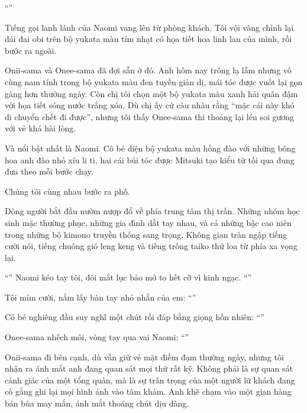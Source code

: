 \documentclass[../main.tex]{subfiles}
\begin{document}
``''

Tiếng gọi lanh lảnh của Naomi vang lên từ phòng khách. Tôi vội vàng chỉnh lại dải đai obi trên bộ yukata màu tím nhạt có họa tiết hoa linh lan của mình, rồi bước ra ngoài.

Onii-sama và Onee-sama đã đợi sẵn ở đó. Anh hôm nay trông lạ lẫm nhưng vô cùng nam tính trong bộ yukata màu đen tuyền giản dị, mái tóc được vuốt lại gọn gàng hơn thường ngày. Còn chị tôi chọn một bộ yukata màu xanh hải quân đậm với họa tiết sóng nước trắng xóa. Dù chị ấy cứ càu nhàu rằng ``mặc cái này khó di chuyển chết đi được'', nhưng tôi thấy Onee-sama thi thoảng lại lén soi gương với vẻ khá hài lòng.

Và nổi bật nhất là Naomi. Cô bé diện bộ yukata màu hồng đào với những bông hoa anh đào nhỏ xíu li ti, hai cái búi tóc được Mitsuki tạo kiểu từ tối qua đung đưa theo mỗi bước chạy.

Chúng tôi cùng nhau bước ra phố.

Dòng người bắt đầu nườm nượp đổ về phía trung tâm thị trấn. Những nhóm học sinh mặc thường phục, những gia đình dắt tay nhau, và cả những bậc cao niên trong những bộ kimono truyền thống sang trọng. Không gian tràn ngập tiếng cười nói, tiếng chuông gió leng keng và tiếng trống taiko thử loa từ phía xa vọng lại.

``'' Naomi kéo tay tôi, đôi mắt lục bảo mở to hết cỡ vì kinh ngạc. ``''

Tôi mỉm cười, nắm lấy bàn tay nhỏ nhắn của em: ``''

Cô bé nghiêng đầu suy nghĩ một chút rồi đáp bằng giọng hồn nhiên: ``''

Onee-sama nhếch môi, vòng tay qua vai Naomi: ``''

Onii-sama đi bên cạnh, dù vẫn giữ vẻ mặt điềm đạm thường ngày, nhưng tôi nhận ra ánh mắt anh đang quan sát mọi thứ rất kỹ. Không phải là sự quan sát cảnh giác của một tổng quản, mà là sự trân trọng của một người lữ khách đang cố gắng ghi lại mọi hình ảnh vào tâm khảm. Anh khẽ chạm vào một gian hàng bán bùa may mắn, ánh mắt thoáng chút dịu dàng.
\end{document}

